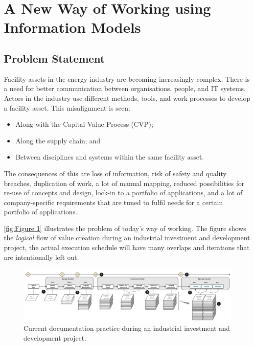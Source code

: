 \documentclass[../main.tex]{subfiles}
\begin{document}
\chapter{A New Way of Working using Information Models}
\label{ch:Chapter 3}




\section{Problem Statement}
\label{ch:Section 1.1}
Facility assets in the energy industry are becoming increasingly complex.
There is a need for better communication between organisations, people, and IT systems. Actors in the industry use
different methods, tools, and work processes to develop a facility asset. This misalignment is seen:

\begin{itemize}
  \item Along with the Capital Value Process (CVP);
  \item Along the supply chain; and
  \item Between disciplines and systems within the same facility asset.
\end{itemize}
The consequences of this are loss of information, risk of safety and quality breaches, duplication of work,
a lot of manual mapping, reduced possibilities for re-use of concepts and design, lock-in to a portfolio of
applications, and a lot of company-specific requirements that are tuned to fulfil needs for a certain portfolio of
applications.

\autoref{fig:Figure 1} illustrates the problem of today's way of working. The figure shows the \emph{logical} flow of value
creation during an industrial investment and development project, the actual execution schedule will have
many overlaps and iterations that are intentionally left out.

\begin{figure}[h]
  \centering
  \includegraphics[width=1\textwidth]{img/IMFmanual-img001.jpg}
  \caption{Current documentation practice during an industrial
    investment and development project.}
  \label{fig:Figure 1}
\end{figure}
\end{document}

